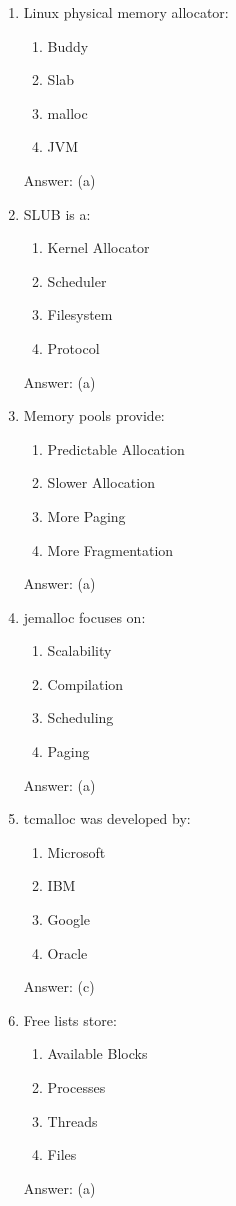 \begin{enumerate}
\item Linux physical memory allocator:
\begin{enumerate}[label=(\alph*)]
\item Buddy
\item Slab
\item malloc
\item JVM
\end{enumerate}
Answer: (a)

\item SLUB is a:
\begin{enumerate}[label=(\alph*)]
\item Kernel Allocator
\item Scheduler
\item Filesystem
\item Protocol
\end{enumerate}
Answer: (a)

\item Memory pools provide:
\begin{enumerate}[label=(\alph*)]
\item Predictable Allocation
\item Slower Allocation
\item More Paging
\item More Fragmentation
\end{enumerate}
Answer: (a)

\item jemalloc focuses on:
\begin{enumerate}[label=(\alph*)]
\item Scalability
\item Compilation
\item Scheduling
\item Paging
\end{enumerate}
Answer: (a)

\item tcmalloc was developed by:
\begin{enumerate}[label=(\alph*)]
\item Microsoft
\item IBM
\item Google
\item Oracle
\end{enumerate}
Answer: (c)

\item Free lists store:
\begin{enumerate}[label=(\alph*)]
\item Available Blocks
\item Processes
\item Threads
\item Files
\end{enumerate}
Answer: (a)


\end{enumerate}
